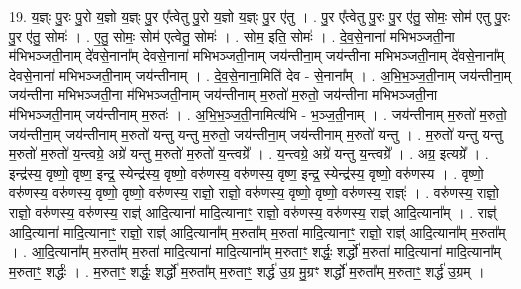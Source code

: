 \documentclass[17pt]{extarticle}
\begin{document}
19. य॒ज्ञ्ः पु॒रः पु॒रो य॒ज्ञो य॒ज्ञ्ः पु॒र ए᳚त्वेतु पु॒रो य॒ज्ञो य॒ज्ञ्ः पु॒र ए॑तु । . पु॒र ए᳚त्वेतु पु॒रः पु॒र ए॑तु॒ सोमः॒ सोम॑ एतु पु॒रः पु॒र ए॑तु॒ सोमः॑ । . ए॒तु॒ सोमः॒ सोम॑ एत्वेतु॒ सोमः॑ । . सोम॒ इति॒ सोमः॑ । . दे॒व॒से॒नाना॑ मभिभञ्जती॒ना म॑भिभञ्जती॒नाम् दे॑वसे॒नाना᳚म् देवसे॒नाना॑ मभिभञ्जती॒नाम् जय॑न्तीना॒म् जय॑न्तीना मभिभञ्जती॒नाम् दे॑वसे॒नाना᳚म् देवसे॒नाना॑ मभिभञ्जती॒नाम् जय॑न्तीनाम् । . दे॒व॒से॒नाना॒मिति॑ देव - से॒नाना᳚म् । . अ॒भि॒भ॒ञ्ज॒ती॒नाम् जय॑न्तीना॒म् जय॑न्तीना मभिभञ्जती॒ना म॑भिभञ्जती॒नाम् जय॑न्तीनाम् म॒रुतो॑ म॒रुतो॒ जय॑न्तीना मभिभञ्जती॒ना म॑भिभञ्जती॒नाम् जय॑न्तीनाम् म॒रुतः॑ । . अ॒भि॒भ॒ञ्ज॒ती॒नामित्य॑भि - भ॒ञ्ज॒ती॒नाम् । . जय॑न्तीनाम् म॒रुतो॑ म॒रुतो॒ जय॑न्तीना॒म् जय॑न्तीनाम् म॒रुतो॑ यन्तु यन्तु म॒रुतो॒ जय॑न्तीना॒म् जय॑न्तीनाम् म॒रुतो॑ यन्तु । . म॒रुतो॑ यन्तु यन्तु म॒रुतो॑ म॒रुतो॑ य॒न्त्वग्रे॒ अग्रे॑ यन्तु म॒रुतो॑ म॒रुतो॑ य॒न्त्वग्रे᳚ । . य॒न्त्वग्रे॒ अग्रे॑ यन्तु य॒न्त्वग्रे᳚ । . अग्र॒ इत्यग्रे᳚ । . इन्द्र॑स्य॒ वृष्णो॒ वृष्ण॒ इन्द्र॒ स्येन्द्र॑स्य॒ वृष्णो॒ वरु॑णस्य॒ वरु॑णस्य॒ वृष्ण॒ 
इन्द्र॒ स्येन्द्र॑स्य॒ वृष्णो॒ वरु॑णस्य । . वृष्णो॒ वरु॑णस्य॒ वरु॑णस्य॒ वृष्णो॒ वृष्णो॒ वरु॑णस्य॒ राज्ञो॒ राज्ञो॒ वरु॑णस्य॒ वृष्णो॒ वृष्णो॒ वरु॑णस्य॒ राज्ञ्ः॑ । . वरु॑णस्य॒ राज्ञो॒ राज्ञो॒ वरु॑णस्य॒ वरु॑णस्य॒ राज्ञ्॑ आदि॒त्याना॑ मादि॒त्यानाꣳ॒॒ राज्ञो॒ वरु॑णस्य॒ वरु॑णस्य॒ राज्ञ्॑ आदि॒त्याना᳚म् । . राज्ञ्॑ आदि॒त्याना॑ मादि॒त्यानाꣳ॒॒ राज्ञो॒ राज्ञ्॑ आदि॒त्याना᳚म् म॒रुता᳚म् म॒रुता॑ मादि॒त्यानाꣳ॒॒ राज्ञो॒ राज्ञ्॑ आदि॒त्याना᳚म् म॒रुता᳚म् । . आ॒दि॒त्याना᳚म् म॒रुता᳚म् म॒रुता॑ मादि॒त्याना॑ मादि॒त्याना᳚म् म॒रुताꣳ॒॒ शर्द्धः॒ शर्द्धो॑ म॒रुता॑ मादि॒त्याना॑ मादि॒त्याना᳚म् म॒रुताꣳ॒॒ शर्द्धः॑ । . म॒रुताꣳ॒॒ शर्द्धः॒ शर्द्धो॑ म॒रुता᳚म् म॒रुताꣳ॒॒ शर्द्ध॑ उ॒ग्र मु॒ग्रꣳ शर्द्धो॑ म॒रुता᳚म् म॒रुताꣳ॒॒ शर्द्ध॑ उ॒ग्रम् । \newline
\end{document}
